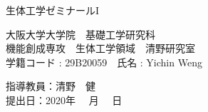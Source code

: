 \documentclass[a4j,12pt,supertabular]{article}
\begin{document}
\setlength{\baselineskip}{15pt}
\thispagestyle{empty}

\begin{center}
	\vspace*{5cm}
	{\Huge 生体工学ゼミナールI}\\
\end{center}
\vspace{5cm}


\begin{center}
	{\Large 大阪大学大学院　基礎工学研究科}\\
	\vspace{0.3cm}
	{\Large 機能創成専攻　生体工学領域　清野研究室}\\
	\vspace{0.3cm}
	{\Large 学籍コード : 29B20059　氏名 : Yichin Weng}\\
\end{center}
\vspace{2cm}
\begin{center}
	{\Large 指導教員：清野　健}\\
	\vspace{2cm}
	{\Large 提出日：2020年　 月　  日}\\
\end{center}


\newpage
\thispagestyle{empty}
\mbox{}


\newpage
{}
\setcounter{page}{1}  %



\newpage




\clearpage
\end{document}
